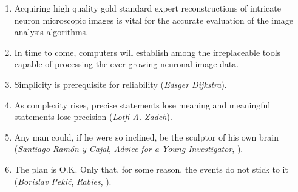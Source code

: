 \documentclass[10pt]{report}%
\begin{document}
\begin{enumerate}
\medskip
\item Acquiring high quality gold standard expert reconstructions of intricate neuron microscopic images is vital for the accurate evaluation of the image analysis algorithms.

\medskip 

\item In time to come, computers will establish among the irreplaceable tools capable of processing the ever growing neuronal image data. 

\medskip
  
\item Simplicity is prerequisite for reliability (\emph{Edsger Dijkstra}).

\medskip

\item As complexity rises, precise statements lose meaning and meaningful statements lose precision (\emph{Lotfi A. Zadeh}).

\medskip

\item Any man could, if he were so inclined, be the sculptor of his own brain (\emph{Santiago Ram\'{o}n y Cajal}, \emph{Advice for a Young Investigator}, ).

\medskip

\item The plan is O.K. Only that, for some reason, the events do not stick to it (\emph{Borislav Peki\'{c}}, \emph{Rabies}, ).

\end{enumerate}

\end{document}
